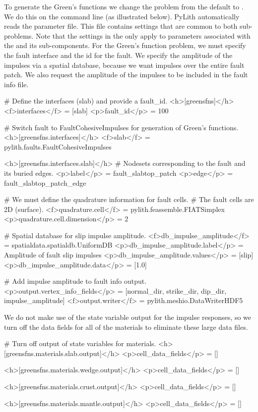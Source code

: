 To generate the Green's functions we change the problem from the
default  to . We do this on
the command line (as illustrated below). PyLith automatically reads
the  parameter file. This file contains
settings that are common to both sub-problems. Note that the settings
in the  only apply to parameters associated
with the  and its sub-components. For the Green's
function problem, we must specify the fault interface and the id for
the fault. We specify the amplitude of the impulses via a
 spatial database, because we want impulses over the
entire fault patch. We also request the amplitude of the impulses to
be included in the fault info file.
\begin{cfg}
# Define the interfaces (slab) and provide a fault_id.
<h>[greensfns]</h>
<f>interfaces</f> = [slab]
<p>fault_id</p> = 100

# Switch fault to FaultCohesiveImpulses for generation of Green's functions.
<h>[greensfns.interfaces]</h>
<f>slab</f> = pylith.faults.FaultCohesiveImpulses

<h>[greensfns.interfaces.slab]</h>
# Nodesets corresponding to the fault and its buried edges.
<p>label</p> = fault_slabtop_patch
<p>edge</p> = fault_slabtop_patch_edge

# We must define the quadrature information for fault cells.
# The fault cells are 2D (surface).
<f>quadrature.cell</f> = pylith.feassemble.FIATSimplex
<p>quadrature.cell.dimension</p> = 2

# Spatial database for slip impulse amplitude.
<f>db_impulse_amplitude</f> = spatialdata.spatialdb.UniformDB
<p>db_impulse_amplitude.label</p> = Amplitude of fault slip impulses
<p>db_impulse_amplitude.values</p> = [slip]
<p>db_impulse_amplitude.data</p> = [1.0]

# Add impulse amplitude to fault info output.
<p>output.vertex_info_fields</p> = [normal_dir, strike_dir, dip_dir, impulse_amplitude]
<f>output.writer</f> = pylith.meshio.DataWriterHDF5
\end{cfg}

We do not make use of the state variable output for the impulse
responses, so we turn off the data fields for all of the
materials to eliminate these large data files.
\begin{cfg}
# Turn off output of state variables for materials.
<h>[greensfns.materials.slab.output]</h>
<p>cell_data_fields</p> = []

<h>[greensfns.materials.wedge.output]</h>
<p>cell_data_fields</p> = []

<h>[greensfns.materials.crust.output]</h>
<p>cell_data_fields</p> = []

<h>[greensfns.materials.mantle.output]</h>
<p>cell_data_fields</p> = []
\end{cfg}

